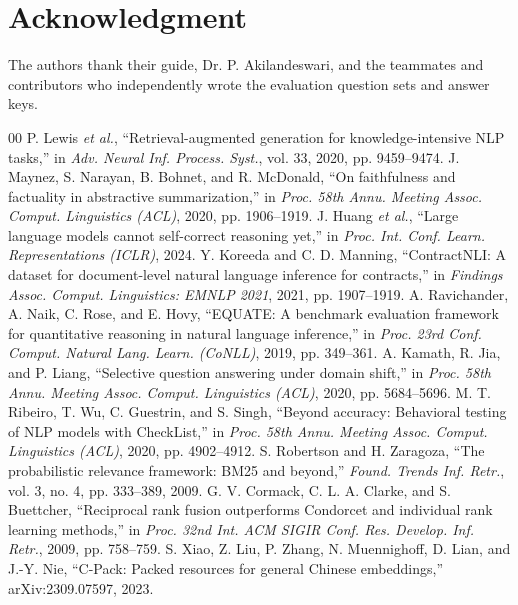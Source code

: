 \documentclass[conference]{IEEEtran}
\begin{document}
\section*{Acknowledgment}
The authors thank their guide, Dr. P. Akilandeswari, and the teammates and contributors who independently
wrote the evaluation question sets and answer keys.

\begin{thebibliography}{00}
 P. Lewis \emph{et al.}, ``Retrieval-augmented generation for knowledge-intensive NLP tasks,'' in \emph{Adv. Neural Inf. Process. Syst.}, vol. 33, 2020, pp. 9459--9474.
 J. Maynez, S. Narayan, B. Bohnet, and R. McDonald, ``On faithfulness and factuality in abstractive summarization,'' in \emph{Proc. 58th Annu. Meeting Assoc. Comput. Linguistics (ACL)}, 2020, pp. 1906--1919.
 J. Huang \emph{et al.}, ``Large language models cannot self-correct reasoning yet,'' in \emph{Proc. Int. Conf. Learn. Representations (ICLR)}, 2024.
 Y. Koreeda and C. D. Manning, ``ContractNLI: A dataset for document-level natural language inference for contracts,'' in \emph{Findings Assoc. Comput. Linguistics: EMNLP 2021}, 2021, pp. 1907--1919.
 A. Ravichander, A. Naik, C. Rose, and E. Hovy, ``EQUATE: A benchmark evaluation framework for quantitative reasoning in natural language inference,'' in \emph{Proc. 23rd Conf. Comput. Natural Lang. Learn. (CoNLL)}, 2019, pp. 349--361.
 A. Kamath, R. Jia, and P. Liang, ``Selective question answering under domain shift,'' in \emph{Proc. 58th Annu. Meeting Assoc. Comput. Linguistics (ACL)}, 2020, pp. 5684--5696.
 M. T. Ribeiro, T. Wu, C. Guestrin, and S. Singh, ``Beyond accuracy: Behavioral testing of NLP models with CheckList,'' in \emph{Proc. 58th Annu. Meeting Assoc. Comput. Linguistics (ACL)}, 2020, pp. 4902--4912.
 S. Robertson and H. Zaragoza, ``The probabilistic relevance framework: BM25 and beyond,'' \emph{Found. Trends Inf. Retr.}, vol. 3, no. 4, pp. 333--389, 2009.
 G. V. Cormack, C. L. A. Clarke, and S. Buettcher, ``Reciprocal rank fusion outperforms Condorcet and individual rank learning methods,'' in \emph{Proc. 32nd Int. ACM SIGIR Conf. Res. Develop. Inf. Retr.}, 2009, pp. 758--759.
 S. Xiao, Z. Liu, P. Zhang, N. Muennighoff, D. Lian, and J.-Y. Nie, ``C-Pack: Packed resources for general Chinese embeddings,'' arXiv:2309.07597, 2023.

\end{thebibliography}
\end{document}
